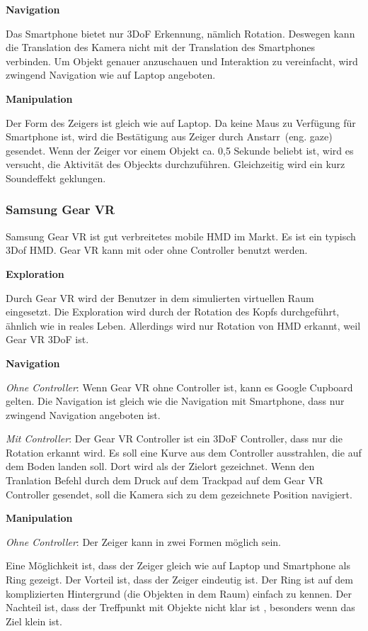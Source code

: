   \textbf{Navigation}
  
  Das Smartphone bietet nur 3DoF Erkennung, nämlich Rotation. Deswegen kann die Translation des Kamera nicht mit der Translation des Smartphones verbinden. Um Objekt genauer anzuschauen und Interaktion zu vereinfacht, wird zwingend Navigation wie auf Laptop angeboten.
  
  \textbf{Manipulation}
  
  Der Form des Zeigers ist gleich wie auf Laptop. Da keine Maus zu Verfügung für Smartphone ist, wird die Bestätigung aus Zeiger durch \glqq Anstarr\grqq\ (eng. gaze) gesendet. Wenn der Zeiger vor einem Objekt ca. 0,5 Sekunde beliebt ist, wird es versucht, die Aktivität des Objeckts durchzuführen. Gleichzeitig wird ein kurz Soundeffekt geklungen.
  
 \subsubsection{Samsung Gear VR}
 Samsung Gear VR ist gut verbreitetes mobile HMD im Markt. Es ist ein typisch 3Dof HMD. Gear VR kann mit oder ohne Controller benutzt werden.
 
  \textbf{Exploration}
  
  Durch Gear VR wird der Benutzer in dem simulierten virtuellen Raum eingesetzt. Die Exploration wird durch der Rotation des Kopfs durchgeführt, ähnlich wie in reales Leben. Allerdings wird nur Rotation von HMD erkannt, weil Gear VR 3DoF ist.
  
  \textbf{Navigation}
  
  \textsl{Ohne Controller}: Wenn Gear VR ohne Controller ist, kann es Google Cupboard gelten. Die Navigation ist gleich wie die Navigation mit Smartphone, dass nur zwingend Navigation angeboten ist.
 
  \textsl{Mit Controller}: Der Gear VR Controller ist ein 3DoF Controller, dass nur die Rotation erkannt wird. Es soll eine Kurve aus dem Controller ausstrahlen, die auf dem Boden landen soll. Dort wird als der Zielort gezeichnet. Wenn den Tranlation Befehl durch dem Druck auf dem Trackpad auf dem Gear VR Controller gesendet, soll die Kamera sich zu dem gezeichnete Position navigiert.

  \textbf{Manipulation}
  
  \textsl{Ohne Controller}: Der Zeiger kann in zwei Formen möglich sein.
  
  Eine Möglichkeit ist, dass der Zeiger gleich wie auf Laptop und Smartphone als Ring gezeigt. Der Vorteil ist, dass der Zeiger eindeutig ist. Der Ring ist auf dem komplizierten Hintergrund (die Objekten in dem Raum) einfach zu kennen. Der Nachteil ist, dass der Treffpunkt mit Objekte nicht klar ist , besonders wenn das Ziel klein ist.
  
